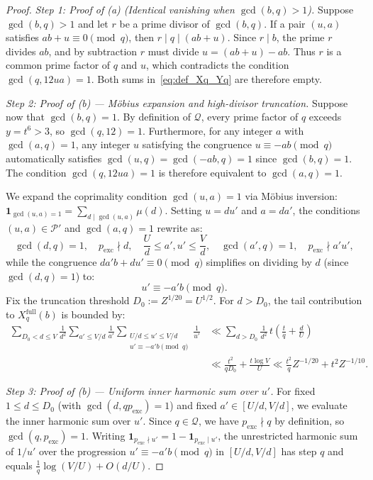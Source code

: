 \documentclass[11pt, a4paper]{article}
\theoremstyle{plain}
\theoremstyle{definition}
\newcommand{\ind}{\mathbf{1}}
\begin{document}
\begin{proof}
\emph{Step 1: Proof of (a) (Identical vanishing when $\gcd(b,q) > 1$).} Suppose $\gcd(b, q) > 1$ and let $r$ be a prime divisor of $\gcd(b, q)$. If a pair $(u,a)$ satisfies $ab + u \equiv 0 \pmod q$, then $r \mid q \mid (ab + u)$. Since $r \mid b$, the prime $r$ divides $ab$, and by subtraction $r$ must divide $u = (ab+u) - ab$. Thus $r$ is a common prime factor of $q$ and $u$, which contradicts the condition $\gcd(q, 12ua) = 1$. Both sums in~\eqref{eq:def_Xq_Yq} are therefore empty.

\medskip\noindent
\emph{Step 2: Proof of (b) --- Möbius expansion and high-divisor truncation.} Suppose now that $\gcd(b,\allowbreak q) = 1$. By definition of $\mathcal{Q}$, every prime factor of $q$ exceeds $y = t^6 > 3$, so $\gcd(q, 12) = 1$. Furthermore, for any integer $a$ with $\gcd(a, q) = 1$, any integer $u$ satisfying the congruence $u \equiv -ab \pmod q$ automatically satisfies $\gcd(u, q) = \gcd(-ab, q) = 1$ since $\gcd(b, q) = 1$. The condition $\gcd(q, 12ua) = 1$ is therefore equivalent to $\gcd(a, q) = 1$.

We expand the coprimality condition $\gcd(u,a) = 1$ via Möbius inversion: $\ind_{\gcd(u,a)=1} = \sum_{d \mid \gcd(u,a)} \mu(d)$. Setting $u = du'$ and $a = da'$, the conditions $(u,a) \in \mathcal{P}'$ and $\gcd(a, q) = 1$ rewrite as:
\[
\gcd(d, q) = 1, \quad p_{\mathrm{exc}} \nmid d, \quad \frac{U}{d} \le a', u' \le \frac{V}{d}, \quad \gcd(a', q) = 1, \quad p_{\mathrm{exc}} \nmid a'u',
\]
while the congruence $da'b + du' \equiv 0 \pmod q$ simplifies on dividing by $d$ (since $\gcd(d, q) = 1$) to:
\[
u' \equiv -a'b \pmod q.
\]
Fix the truncation threshold $D_0 := Z^{1/20} = U^{1/2}$. For $d > D_0$, the tail contribution to $X_q^{\mathrm{full}}(b)$ is bounded by:
\[
\begin{aligned}
\sum_{D_0 < d \le V} \frac{1}{d^2} \sum_{a' \le V/d} \frac{1}{a'} \sum_{\substack{U/d \le u' \le V/d \\ u' \equiv -a'b \pmod q}} \frac{1}{u'} &\ll \sum_{d > D_0} \frac{1}{d^2} \, t \left(\frac{t}{q} + \frac{d}{U}\right) \\
&\ll \frac{t^2}{q D_0} + \frac{t \log V}{U} \ll \frac{t^2}{q} Z^{-1/20} + t^2 Z^{-1/10}.
\end{aligned}
\]

\medskip\noindent
\emph{Step 3: Proof of (b) --- Uniform inner harmonic sum over $u'$.} For fixed $1 \le d \le D_0$ (with $\gcd(d, q p_{\mathrm{exc}}) = 1$) and fixed $a' \in [U/d, V/d]$, we evaluate the inner harmonic sum over $u'$. Since $q \in \mathcal{Q}$, we have $p_{\mathrm{exc}} \nmid q$ by definition, so $\gcd(q, p_{\mathrm{exc}}) = 1$. Writing $\ind_{p_{\mathrm{exc}} \nmid u'} = 1 - \ind_{p_{\mathrm{exc}} \mid u'}$, the unrestricted harmonic sum of $1/u'$ over the progression $u' \equiv -a'b \pmod q$ in $[U/d, V/d]$ has step $q$ and equals $\frac{1}{q}\log(V/U) + O(d/U)$.


\end{proof}
\end{document}
